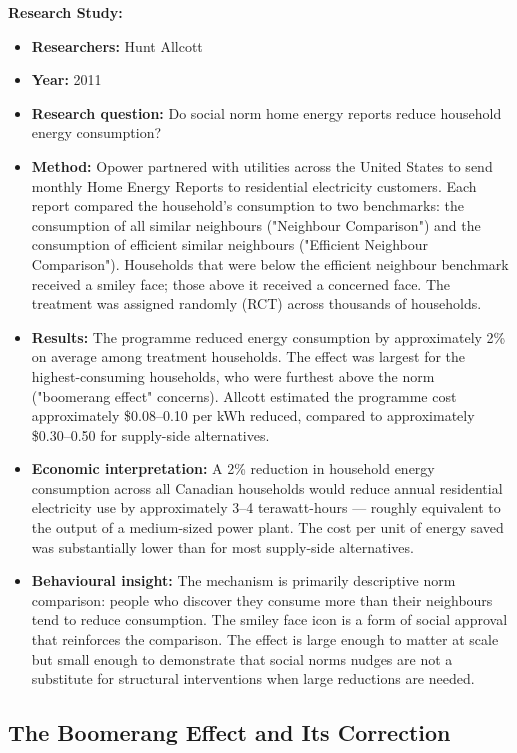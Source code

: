 \documentclass[12pt, letterpaper]{article}
\begin{document}
\textbf{Research Study:}
\begin{itemize}
\item \textbf{Researchers:} Hunt Allcott
\item \textbf{Year:} 2011
\item \textbf{Research question:} Do social norm home energy reports reduce household energy consumption?
\item \textbf{Method:} Opower partnered with utilities across the United States to send monthly Home Energy Reports to residential electricity customers. Each report compared the household's consumption to two benchmarks: the consumption of all similar neighbours ("Neighbour Comparison") and the consumption of efficient similar neighbours ("Efficient Neighbour Comparison"). Households that were below the efficient neighbour benchmark received a smiley face; those above it received a concerned face. The treatment was assigned randomly (RCT) across thousands of households.
\item \textbf{Results:} The programme reduced energy consumption by approximately 2\% on average among treatment households. The effect was largest for the highest-consuming households, who were furthest above the norm ("boomerang effect" concerns). Allcott estimated the programme cost approximately \$0.08--0.10 per kWh reduced, compared to approximately \$0.30--0.50 for supply-side alternatives.
\item \textbf{Economic interpretation:} A 2\% reduction in household energy consumption across all Canadian households would reduce annual residential electricity use by approximately 3--4 terawatt-hours --- roughly equivalent to the output of a medium-sized power plant. The cost per unit of energy saved was substantially lower than for most supply-side alternatives.
\item \textbf{Behavioural insight:} The mechanism is primarily descriptive norm comparison: people who discover they consume more than their neighbours tend to reduce consumption. The smiley face icon is a form of social approval that reinforces the comparison. The effect is large enough to matter at scale but small enough to demonstrate that social norms nudges are not a substitute for structural interventions when large reductions are needed.
\end{itemize}


\subsection{The Boomerang Effect and Its Correction}
\end{document}

